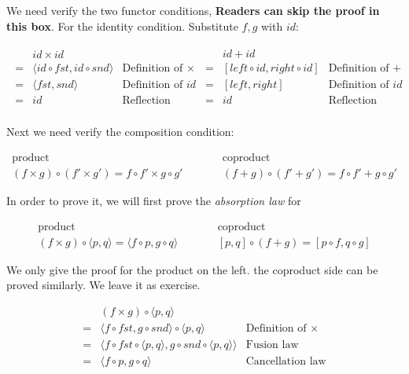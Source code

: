 \documentclass[b5paper]{article}
\begin{document}
\begin{mdframed}
We need verify the two functor conditions, \textbf{Readers can skip the proof in this box}. For the identity condition. Substitute $f, g$ with $id$:

\[
\begin{array}{lr}
  \begin{array}{cll}
    & id \times id & \\
  = & \langle id \circ fst, id \circ snd \rangle & \text{Definition of $\times$} \\
  = & \langle fst, snd \rangle & \text{Definition of $id$} \\
  = & id & \text{Reflection law} \\
  \end{array}
  &
  \begin{array}{cll}
    & id + id & \\
  = & [ left \circ id, right \circ id ] & \text{Definition of $+$} \\
  = & [ left, right] & \text{Definition of $id$} \\
  = & id & \text{Reflection law} \\
  \end{array}
\end{array}
\]

Next we need verify the composition condition:

\[
\begin{array}{ccc}
\text{product} & \quad \quad & \text{coproduct} \\
 (f \times g) \circ (f' \times g') = f \circ f' \times g \circ g'
 & \quad \quad &
 (f + g) \circ (f' + g') = f \circ f' + g \circ g'
\end{array}
\]

In order to prove it, we will first prove the {\em absorption law} for

\[
\begin{array}{ccc}
  \text{product} & \quad \quad & \text{coproduct} \\
  (f \times g) \circ \langle p, q \rangle = \langle f \circ p, g \circ q \rangle
  & \quad \quad &
  [p, q] \circ (f + g) = [p \circ f, q \circ g]
\end{array}
\]

We only give the proof for the product on the left. the coproduct side can be proved similarly. We leave it as exercise.

\[
\begin{array}{cll}
   & (f \times g) \circ \langle p, q \rangle & \\
 = & \langle f \circ fst, g \circ snd \rangle \circ \langle p, q \rangle & \text{Definition of $\times$} \\
 = & \langle f \circ fst \circ \langle p, q \rangle, g \circ snd \circ \langle p, q \rangle \rangle & \text{Fusion law} \\
 = & \langle f \circ p, g \circ q \rangle & \text{Cancellation law} \\
\end{array}
\]


\end{mdframed}
\end{document}
